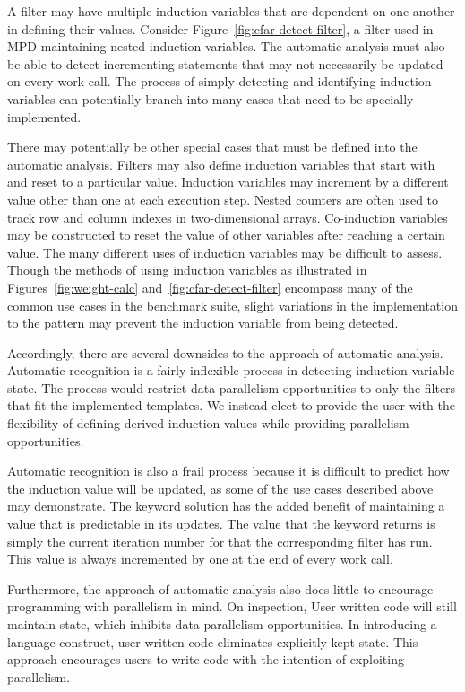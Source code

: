 A filter may have multiple induction variables that are dependent on one another in defining their values.  Consider Figure~\ref{fig:cfar-detect-filter}, a filter used in MPD maintaining nested induction variables.  The automatic analysis must also be able to detect incrementing statements that may not necessarily be updated on every work call.  The process of simply detecting and identifying induction variables can potentially branch into many cases that need to be specially implemented.

There may potentially be other special cases that must be defined into the automatic analysis.  Filters may also define induction variables that start with and reset to a particular value.  Induction variables may increment by a different value other than one at each execution step.  Nested counters are often used to track row and column indexes in two-dimensional arrays.  Co-induction variables may be constructed to reset the value of other variables after reaching a certain value.  The many different uses of induction variables may be difficult to assess.  Though the methods of using induction variables as illustrated in Figures~\ref{fig:weight-calc} and~\ref{fig:cfar-detect-filter} encompass many of the common use cases in the benchmark suite, slight variations in the implementation to the pattern may prevent the induction variable from being detected.

Accordingly, there are several downsides to the approach of automatic analysis.  Automatic recognition is a fairly inflexible process in detecting induction variable state.  The process would restrict data parallelism opportunities to only the filters that fit the implemented templates.  We instead elect to provide the user with the flexibility of defining derived induction values while providing parallelism opportunities.  

Automatic recognition is also a frail process because it is difficult to predict how the induction value will be updated, as some of the use cases described above may demonstrate.  The keyword solution has the added benefit of maintaining a value that is predictable in its updates.  The value that the keyword returns is simply the current iteration number for that the corresponding filter has run.  This value is always incremented by one at the end of every work call.  

Furthermore, the approach of automatic analysis also does little to encourage programming with parallelism in mind.  On inspection, User written code will still maintain state, which inhibits data parallelism opportunities.  In introducing a language construct, user written code eliminates explicitly kept state.  This approach encourages users to write code with the intention of exploiting parallelism.


